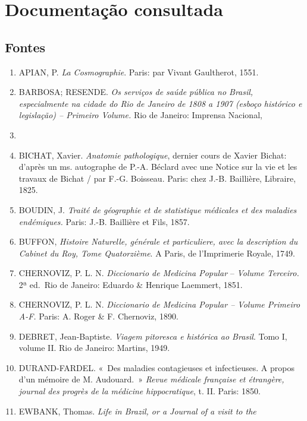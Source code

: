 \chapter{Documentação consultada}\label{documentauxe7uxe3o-consultada}

\section*{Fontes}\label{fontes}

\begin{enumerate}
\def\labelenumi{\arabic{enumi}.}
\item
  APIAN, P. \emph{La Cosmographie}. Paris: par Vivant Gaultherot, 1551.
\item
  BARBOSA; RESENDE. \emph{Os serviços de saúde pública no Brasil,
  especialmente na cidade do Rio de Janeiro de 1808 a 1907 (esboço
  histórico e legislação) -- Primeiro Volume.} Rio de Janeiro: Imprensa
  Nacional,
\item
\item
  BICHAT, Xavier. \emph{Anatomie pathologique}, dernier cours de Xavier
  Bichat: d'après un ms. autographe de P.-A. Béclard avec une Notice sur
  la vie et les travaux de Bichat / par F.-G. Boisseau. Paris: chez
  J.-B. Baillière, Libraire, 1825.
\item
  BOUDIN, J. \emph{Traité de géographie et de statistique médicales et
  des maladies endémiques.} Paris: J.-B. Baillière et Fils, 1857.
\item
  BUFFON, \emph{Histoire Naturelle, générale et particuliere, avec la
  description du Cabinet du Roy, Tome Quatorzième}. A Paris, de
  l'Imprimerie Royale, 1749.
\item
  CHERNOVIZ, P. L. N. \emph{Diccionario de Medicina Popular} --
  \emph{Volume Terceiro.} 2ª ed.~Rio de Janeiro: Eduardo \& Henrique
  Laemmert, 1851.
\item
  CHERNOVIZ, P. L. N. \emph{Diccionario de Medicina Popular -- Volume
  Primeiro A-F.} Paris: A. Roger \& F. Chernoviz, 1890.
\item
  DEBRET, Jean-Baptiste. \emph{Viagem pitoresca e histórica ao Brasil}.
  Tomo I, volume II. Rio de Janeiro: Martins, 1949.
\item
  DURAND-FARDEL. «~Des maladies contagieuses et infectieuses. A propos
  d'un mémoire de M. Audouard.~» \emph{Revue médicale française et
  étrangère, journal des progrès de la médicine hippocratique}, t. II.
  Paris: 1850.
\item
  EWBANK, Thomas. \emph{Life in Brazil, or a Journal of a visit to the
}
\end{enumerate}
